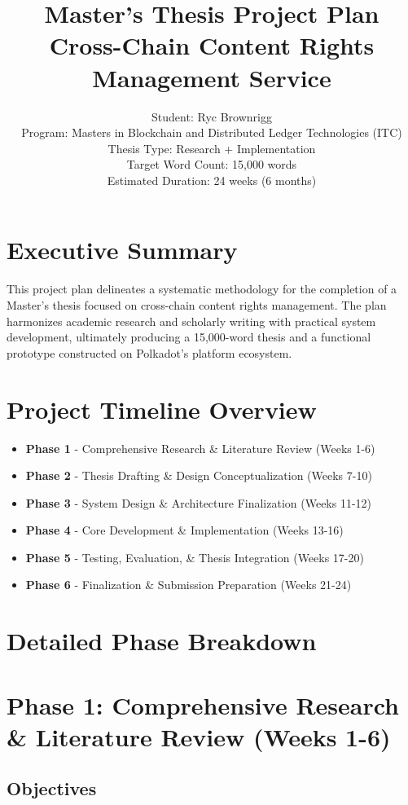 \documentclass[12pt,a4paper]{article}
\title{Master's Thesis Project Plan\\
\large Cross-Chain Content Rights Management Service}
\author{Student: Ryc Brownrigg\\
Program: Masters in Blockchain and Distributed Ledger Technologies (ITC)\\
Thesis Type: Research + Implementation\\
Target Word Count: 15,000 words\\
Estimated Duration: 24 weeks (6 months)}
\date{}
\begin{document}
\sloppy

\maketitle

\section*{Executive Summary}

This project plan delineates a systematic methodology for the completion of a Master's thesis focused on cross-chain content rights management. The plan harmonizes academic research and scholarly writing with practical system development, ultimately producing a 15,000-word thesis and a functional prototype constructed on Polkadot's platform ecosystem.

\section*{Project Timeline Overview}

\begin{itemize}
    \item \textbf{Phase 1} - Comprehensive Research \& Literature Review (Weeks 1-6)
    \item \textbf{Phase 2} - Thesis Drafting \& Design Conceptualization (Weeks 7-10)
    \item \textbf{Phase 3} - System Design \& Architecture Finalization (Weeks 11-12)
    \item \textbf{Phase 4} - Core Development \& Implementation (Weeks 13-16)
    \item \textbf{Phase 5} - Testing, Evaluation, \& Thesis Integration (Weeks 17-20)
    \item \textbf{Phase 6} - Finalization \& Submission Preparation (Weeks 21-24)
\end{itemize}

\section*{Detailed Phase Breakdown}

\section{Phase 1: Comprehensive Research \& Literature Review (Weeks 1-6)}

\subsection*{Objectives}
\end{document}
